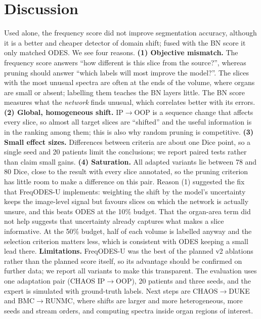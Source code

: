 \documentclass[a4paper,fleqn]{cas-sc}
\begin{document}
\section{Discussion}
Used alone, the frequency score did not improve segmentation accuracy, although it is a better and cheaper detector of domain shift; fused with the BN score it only matched ODES. We see four reasons.
\textbf{(1) Objective mismatch.} The frequency score answers ``how different is this slice from the source?'', whereas pruning should answer ``which labels will most improve the model?''. The slices with the most unusual spectra are often at the ends of the volume, where organs are small or absent; labelling them teaches the BN layers little. The BN score measures what the \emph{network} finds unusual, which correlates better with its errors.
\textbf{(2) Global, homogeneous shift.} IP$\rightarrow$OOP is a sequence change that affects every slice, so almost all target slices are ``shifted'' and the useful information is in the ranking among them; this is also why random pruning is competitive.
\textbf{(3) Small effect sizes.} Differences between criteria are about one Dice point, so a single seed and 20 patients limit the conclusions; we report paired tests rather than claim small gains.
\textbf{(4) Saturation.} All adapted variants lie between 78 and 80 Dice, close to the result with every slice annotated, so the pruning criterion has little room to make a difference on this pair.
Reason (1) suggested the fix that FreqODES-U implements: weighting the shift by the model's uncertainty keeps the image-level signal but favours slices on which the network is actually unsure, and this beats ODES at the 10\% budget. That the organ-area term did not help suggests that uncertainty already captures what makes a slice informative. At the 50\% budget, half of each volume is labelled anyway and the selection criterion matters less, which is consistent with ODES keeping a small lead there.
\textbf{Limitations.} FreqODES-U was the best of the planned v2 ablations rather than the planned score itself, so its advantage should be confirmed on further data; we report all variants to make this transparent. The evaluation uses one adaptation pair (CHAOS IP$\rightarrow$OOP), 20 patients and three seeds, and the expert is simulated with ground-truth labels. Next steps are CHAOS$\rightarrow$DUKE and BMC$\rightarrow$RUNMC, where shifts are larger and more heterogeneous, more seeds and stream orders, and computing spectra inside organ regions of interest.
\end{document}

